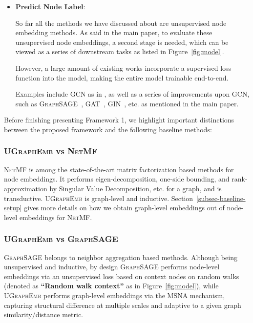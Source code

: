 \documentclass{article}
\newcommand{\model}{\textsc{UGraphEmb}\xspace}
\newcommand{\netmf}{\textsc{NetMF}\xspace}
\newcommand{\graphsage}{\textsc{GraphSAGE}\xspace}
\newcommand{\gcn}{\textsc{GCN}\xspace}
\begin{document}
\begin{itemize}
    
    
    


    
    
    
    \item \textbf{{Predict Node Label}}: 
    
    So far all the methods we have discussed about are unsupervised node embedding methods. As said in the main paper, to evaluate these unsupervised node embeddings, a second stage is needed, which can be viewed as a series of downstream  tasks as listed in Figure~\ref{fig:model}.
    
    However, a large amount of existing works incorporate a supervised loss function into the model, making the entire model trainable end-to-end. 
    
    Examples include \gcn as in \cite{kipf2016variational}, as well as a series of improvements upon \gcn, such as \textsc{GraphSAGE}~\cite{hamilton2017inductive}, \textsc{GAT}~\cite{velickovic2017graph}, \textsc{GIN}~\cite{xu2018powerful}, etc. as mentioned in the main paper.
\end{itemize}

Before finishing presenting Framework 1, we highlight important distinctions between the proposed framework and the following baseline methods:

\subsubsection{\model vs \netmf}

\netmf is among the state-of-the-art matrix factorization based methods for node embeddings. It performs eigen-decomposition, one-side bounding, and rank- approximation by Singular Value Decomposition, etc. for a graph, and is transductive. \model is graph-level and inductive. Section~\ref{subsec-baseline-setup} gives more details on how we obtain graph-level embeddings out of node-level embeddings for \netmf.

\subsubsection{\model vs \graphsage}

\graphsage belongs to neighbor aggregation based methods. 
Although being unsupervised and inductive, by design \graphsage performs node-level embeddings via an unsupervised loss based on context nodes on random walks (denoted as {\textbf{``Random walk context''}} as in Figure~\ref{fig:model}), while \model performs graph-level embeddings via the MSNA mechanism, capturing structural difference at multiple scales and adaptive to a given graph similarity/distance metric. 
\end{document}
